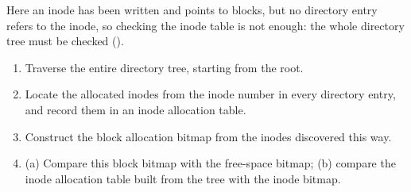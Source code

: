 Here an inode has been written and points to blocks, but no directory entry refers to the inode, so checking the inode table is not enough: the whole directory tree must be checked ().
\begin{enumerate}
  \item Traverse the entire directory tree, starting from the root.
  \item Locate the allocated inodes from the inode number in every directory entry, and record them in an inode allocation table.
  \item Construct the block allocation bitmap from the inodes discovered this way.
  \item (a) Compare this block bitmap with the free-space bitmap; (b) compare the inode allocation table built from the tree with the inode bitmap.
\end{enumerate}

